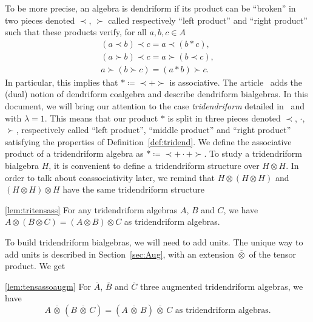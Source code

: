\documentclass[pdftex]{sigma}
\numberwithin{equation}{section}
\theoremstyle{definition}
\theoremstyle{plain}
\begin{document}
 To be more precise, an algebra is dendriform if its product can be ``broken'' in two pieces denoted $\prec$, $\succ$ called respectively ``left product'' and ``right product'' such that these products verify, for all $a,b,c\in A$
\begin{gather*}
	(a\prec b)\prec c= a\prec (b*c), \\
	(a\succ b)\prec c= a\succ (b\prec c), \\
	a\succ (b\succ c)= (a*b)\succ c.
\end{gather*}
In particular, this implies that $*\coloneqq\prec+\succ$ is associative. The article~\cite{bidend} adds the (dual) notion of dendriform coalgebra and describe dendriform bialgebras.
In this document, we will bring our attention to the case \emph{tridendriform} detailed in~\cite{Trial} and~\cite{Tridend} with $\lambda=1$. This means that our product $*$ is split in three pieces denoted $\prec$, $\cdot$, $\succ$, respectively called ``left product'', ``middle product'' and ``right product'' satisfying the properties of Definition~\ref{def:tridend}.
We define the associative product of a tridendriform algebra as $*\coloneqq\prec+\cdot+\succ$. To study a tridendriform bialgebra $H$, it is convenient to define a tridendriform structure over $H\otimes H$.
 In order to talk about coassociativity later, we remind that $H\otimes(H\otimes H)$ and $(H\otimes H)\otimes H$ have the same tridendriform structure
\begin{customlemma}{\ref{lem:tritensass}}
	For any tridendriform algebras $A$, $B$ and $C$, we have $A\otimes(B\otimes C)=(A\otimes B)\otimes C$ as tridendriform algebras.
\end{customlemma}
To build tridendriform bialgebras, we will need to add units. The unique way to add units is described in Section~\ref{sec:Aug}, with an extension $\overline{\otimes}$ of the tensor product. We get

\begin{customlemma}{\ref{lem:tensassoaugm}}
	For $\overline{A}$, $\overline{B}$ and $\overline{C}$ three augmented tridendriform algebras, we have
	\[
	A\,\overline{\otimes}\, (B\,\overline{\otimes} \,C)=(A\, \overline{\otimes}\,B)\, \overline{\otimes}\,C \text{ as tridendriform algebras.}
	\]
\end{customlemma}
\end{document}
